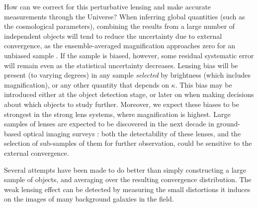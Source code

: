 \documentclass[useAMS,usenatbib]{mn2e}
\begin{document}
How can we correct for this perturbative lensing and make accurate
measurements through the Universe? When inferring global quantities
(such as the cosmological parameters), combining the results from a
large number of independent objects will tend to reduce the uncertainty
due to external convergence, as the ensemble-averaged magnification
approaches zero for an unbiased sample \citep[\eg][]{Holz+Linder2005}.
If the sample is biased, however, some residual systematic error will
remain even as the statistical uncertainty decreases. Lensing bias will
be present (to varying degrees) in any sample {\it selected} by
brightness (which includes magnification), or any other quantity that
depends on $\kappa$. This bias may be introduced either at the object
detection stage, or later on when making decisions about which objects
to study further.  Moreover, we expect these biases to be strongest in
the strong lens systems, where magnification is highest. Large samples
of lenses are expected to be discovered in the next decade in
ground-based optical imaging surveys \citep{Oguri+Marshall2010}: both
the detectability of these lenses,  and the selection of sub-samples of
them for further observation, could be sensitive to the external
convergence. 

Several attempts have been made to do better than simply constructing a
large sample of objects, and averaging over the resulting convergence
distribution. The weak lensing effect can be detected by measuring the
small distortions it induces on the images of many background galaxies
in the field. 

\end{document}
